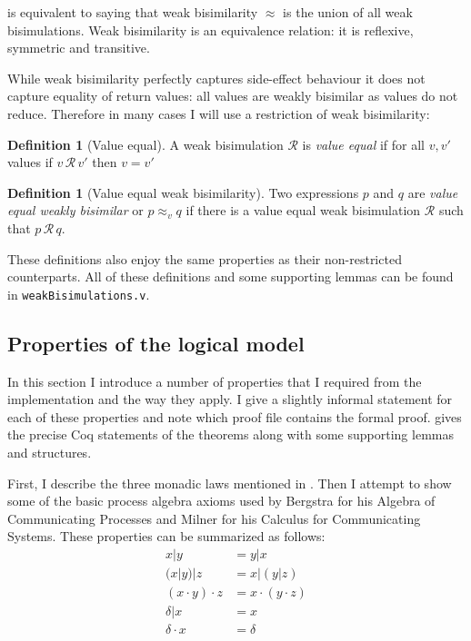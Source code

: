 \documentclass[12pt,twoside,notitlepage]{report}
\theoremstyle{plain}%
\theoremstyle{definition}
\newtheorem{defn}[thm]{Definition}
\theoremstyle{remark}
\begin{document}
 is equivalent to saying that weak bisimilarity $ \approx  $ is the union of all weak bisimulations. Weak bisimilarity is an equivalence relation: it is reflexive, symmetric and transitive.

While weak bisimilarity perfectly captures side-effect behaviour it does not capture equality of return values: all values are weakly bisimilar as values do not reduce. Therefore in many cases I will use a restriction of weak bisimilarity:

\begin{defn}[Value equal]
\label{defn:ve_weak_bisim}
A weak bisimulation $ \mathcal{R} $ is \textit{value equal} if for all $ v, v' $ values if $ v\,\mathcal{R}\,v' $ then $ v = v' $
\end{defn}

\begin{defn}[Value equal weak bisimilarity]
\label{defn:ve_weak_bisimilarity}
Two expressions $ p $ and $ q $ are \textit{value equal weakly bisimilar} or $ p\approx_v q $ if there is a value equal weak bisimulation $ \mathcal{R} $ such that $ p\, \mathcal{R} \, q $.
\end{defn}

These definitions also enjoy the same properties as their non-restricted counterparts. All of these definitions and some supporting lemmas can be found in \verb|weakBisimulations.v|.
\subsection{Properties of the logical model}

In this section I introduce a number of properties that I required from the implementation and the way they apply. I give a slightly informal statement for each of these properties and note which proof file contains the formal proof.  gives the precise Coq statements of the theorems along with some supporting lemmas and structures. 

First, I describe the three monadic laws mentioned in . Then I attempt to show some of the basic process algebra axioms used by Bergstra for his Algebra of Communicating Processes\cite{bergstra1984process,bergstra1986algebra} and Milner for his Calculus for Communicating Systems\cite{milner1982calculus}. These properties can be summarized as follows:
\begin{align}
x | y &= y | x \tag{$\, \mid $ commutativity} \label{eq:fork_comm}\\
(x | y) | z &= x | (y | z) \tag{$\, \mid $ associativity} \label{eq:fork_assoc}\\
(x \cdot y)\cdot z &= x \cdot (y \cdot z) \tag{$\cdot$ associativity} \label{eq:bind_assoc}\\
\delta | x &= x \tag{ $\, \mid $ deadlock}\label{eq:fork_deadlock} \\
\delta \cdot x &= \tag{$\cdot$ deadlock}\delta \label{eq:bind_deadlock}
\end{align}
\end{document}
